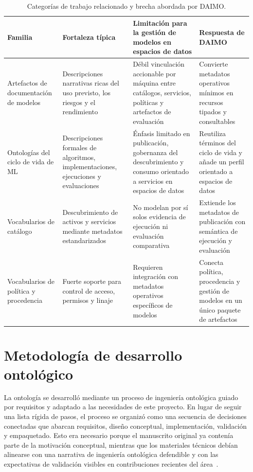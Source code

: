 \documentclass[11pt,a4paper]{article}
\begin{document}
\begin{table}[t]
\caption{Categorías de trabajo relacionado y brecha abordada por DAIMO.}
\label{tab:related}
\centering
\small
\begin{tabularx}{\textwidth}{@{}L{3cm}XXX@{}}
\toprule
\textbf{Familia} & \textbf{Fortaleza típica} & \textbf{Limitación para la gestión de modelos en espacios de datos} & \textbf{Respuesta de DAIMO} \\
\midrule
Artefactos de documentación de modelos &
Descripciones narrativas ricas del uso previsto, los riesgos y el rendimiento &
Débil vinculación accionable por máquina entre catálogos, servicios, políticas y artefactos de evaluación &
Convierte metadatos operativos mínimos en recursos tipados y consultables \\[0.5em]

Ontologías del ciclo de vida de ML &
Descripciones formales de algoritmos, implementaciones, ejecuciones y evaluaciones &
Énfasis limitado en publicación, gobernanza del descubrimiento y consumo orientado a servicios en espacios de datos &
Reutiliza términos del ciclo de vida y añade un perfil orientado a espacios de datos \\[0.5em]

Vocabularios de catálogo &
Descubrimiento de activos y servicios mediante metadatos estandarizados &
No modelan por sí solos evidencia de ejecución ni evaluación comparativa &
Extiende los metadatos de publicación con semántica de ejecución y evaluación \\[0.5em]

Vocabularios de política y procedencia &
Fuerte soporte para control de acceso, permisos y linaje &
Requieren integración con metadatos operativos específicos de modelos &
Conecta política, procedencia y gestión de modelos en un único paquete de artefactos \\
\bottomrule
\end{tabularx}
\end{table}

\section{Metodología de desarrollo ontológico}\label{sec:method}

La ontología se desarrolló mediante un proceso de ingeniería ontológica guiado por requisitos y adaptado a las necesidades de este proyecto. En lugar de seguir una lista rígida de pasos, el proceso se organizó como una secuencia de decisiones conectadas que abarcan requisitos, diseño conceptual, implementación, validación y empaquetado. Esto era necesario porque el manuscrito original ya contenía parte de la motivación conceptual, mientras que los materiales técnicos debían alinearse con una narrativa de ingeniería ontológica defendible y con las expectativas de validación visibles en contribuciones recientes del área~\cite{kurteva,palma,woods,bareedu24}.
\end{document}

